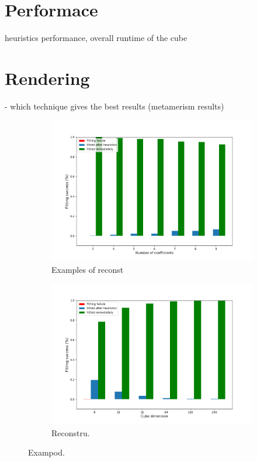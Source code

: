 \section{Performace}

heuristics performance, overall runtime of the cube

\section{Rendering}

- which technique gives the best results (metamerism results)



\begin{figure}[t]
	\centering
	\vspace{1em}
	\begin{subfigure}[t]{0.49\textwidth}
		\includegraphics[width=\linewidth]{img/results_perf_fitting_cd16.png}
		\caption{Examples of reconst}
		\label{fig:mom}
	\end{subfigure} \hspace{0.1em}
	\begin{subfigure}[t]{0.49\textwidth}
		\includegraphics[width=\linewidth]{img/results_perf_fitting_9moments.png}
		\caption{Reconstru.}
		\label{fig:m}
	\end{subfigure}
	\caption{Exampod.}
	\label{fig:temp}
\end{figure}


